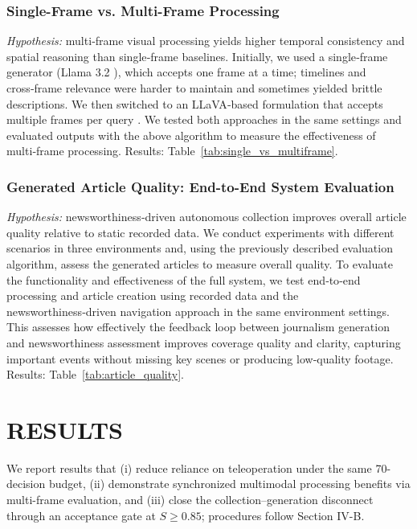 \documentclass[letterpaper, 10 pt, conference]{ieeeconf}  %
\begin{document}
\subsubsection{Single-Frame vs. Multi-Frame Processing}
\textit{Hypothesis:} multi‑frame visual processing yields higher temporal consistency and spatial reasoning than single‑frame baselines.
Initially, we used a single‑frame generator (Llama 3.2 \cite{llama3_2024}), which accepts one frame at a time; timelines and cross‑frame relevance were harder to maintain and sometimes yielded brittle descriptions. We then switched to an LLaVA‑based formulation \cite{liu2023llava,li2024llava} that accepts multiple frames per query \cite{liu2023llava,li2024llava}. We tested both approaches in the same settings and evaluated outputs with the above algorithm to measure the effectiveness of multi‑frame processing. Results: Table~\ref{tab:single_vs_multiframe}.

\subsubsection{Generated Article Quality: End-to-End System Evaluation}
\textit{Hypothesis:} newsworthiness‑driven autonomous collection improves overall article quality relative to static recorded data.
We conduct experiments with different scenarios in three environments and, using the previously described evaluation algorithm, assess the generated articles to measure overall quality. To evaluate the functionality and effectiveness of the full system, we test end‑to‑end processing and article creation using recorded data and the newsworthi\-ness‑driven navigation approach in the same environment settings. This assesses how effectively the feedback loop between journalism generation and newsworthi\-ness assessment improves coverage quality and clarity, capturing important events without missing key scenes or producing low‑quality footage. Results: Table~\ref{tab:article_quality}.

\vspace{-2pt}
\section{RESULTS}

We report results that (i) reduce reliance on teleoperation under the same 70-decision budget, (ii) demonstrate synchronized multi\-modal processing benefits via multi-frame evaluation, and (iii) close the collection–generation disconnect through an acceptance gate at $S\!\ge\!0.85$; procedures follow Section IV-B.
\end{document}
